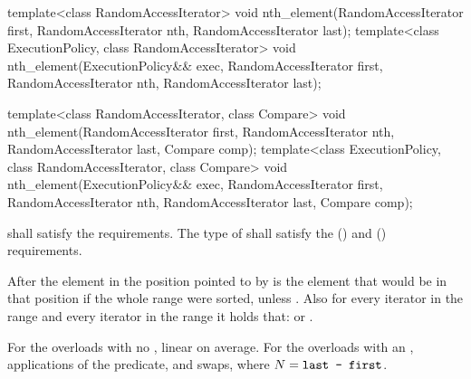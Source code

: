 %
\begin{itemdecl}
template<class RandomAccessIterator>
  void nth_element(RandomAccessIterator first, RandomAccessIterator nth,
                   RandomAccessIterator last);
template<class ExecutionPolicy, class RandomAccessIterator>
  void nth_element(ExecutionPolicy&& exec,
                   RandomAccessIterator first, RandomAccessIterator nth,
                   RandomAccessIterator last);

template<class RandomAccessIterator, class Compare>
  void nth_element(RandomAccessIterator first, RandomAccessIterator nth,
                   RandomAccessIterator last,  Compare comp);
template<class ExecutionPolicy, class RandomAccessIterator, class Compare>
  void nth_element(ExecutionPolicy&& exec,
                   RandomAccessIterator first, RandomAccessIterator nth,
                   RandomAccessIterator last, Compare comp);
\end{itemdecl}

\begin{itemdescr}
\pnum
\requires
{} shall satisfy the
 requirements. The type
of  shall satisfy the
 () and
 () requirements.

\pnum
\effects
After
the element in the position pointed to by 
is the element that would be
in that position if the whole range were sorted, unless .
Also for every iterator
in the range
and every iterator
in the range
it holds that:
or
.

\pnum
\complexity
For the overloads with no , linear on average.
For the overloads with an ,  applications of
the predicate, and  swaps, where $N = \texttt{last - first}$.
\end{itemdescr}

